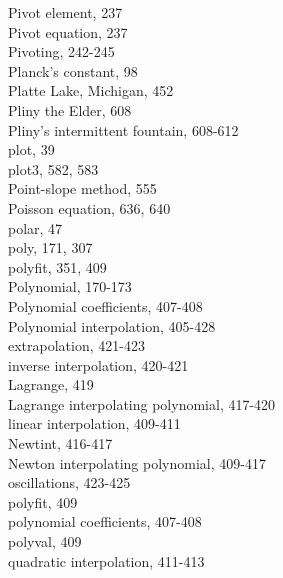 \documentclass[../main.tex]{subfiles}
\begin{document}
\begin{multicols}{3}
    Pivot element, 237\\
    Pivot equation, 237\\
    Pivoting, 242-245\\
    Planck's constant, 98\\
    Platte Lake, Michigan, 452\\
    Pliny the Elder, 608\\
    Pliny's intermittent fountain, 608-612\\
    plot, 39\\
    plot3, 582, 583\\
    Point-slope method, 555\\
    Poisson equation, 636, 640\\
    polar, 47\\
    poly, 171, 307\\
    polyfit, 351, 409\\
    Polynomial, 170-173\\
    Polynomial coefficients, 407-408\\
    Polynomial interpolation, 405-428\\
    \hspace*{3mm}extrapolation, 421-423\\
    \hspace*{3mm}inverse interpolation, 420-421\\
    \hspace*{3mm}Lagrange, 419\\
    \hspace*{3mm}Lagrange interpolating polynomial, 417-420\\
    \hspace*{3mm}linear interpolation, 409-411\\
    \hspace*{3mm}Newtint, 416-417\\
    \hspace*{3mm}Newton interpolating polynomial, 409-417\\
    \hspace*{3mm}oscillations, 423-425\\
    \hspace*{3mm}polyfit, 409\\
    \hspace*{3mm}polynomial coefficients, 407-408\\
    \hspace*{3mm}polyval, 409\\
    \hspace*{3mm}quadratic interpolation, 411-413\\

\end{multicols}
\end{document}
